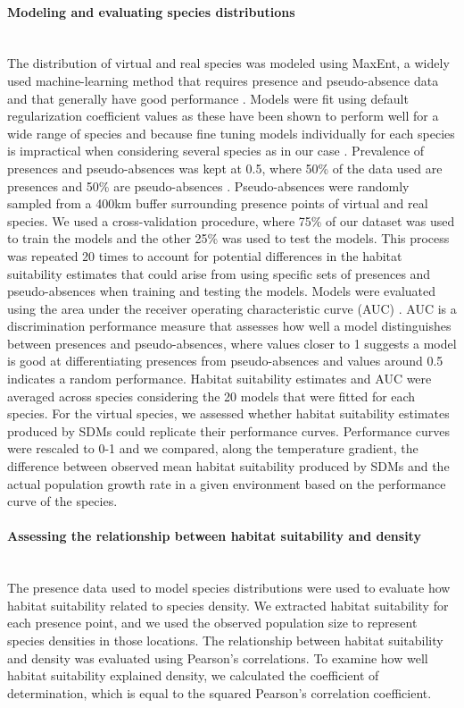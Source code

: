 \paragraph*{Modeling and evaluating species distributions}\mbox{}\\
The distribution of virtual and real species was modeled using MaxEnt, a widely used machine-learning method that requires presence and pseudo-absence data and that generally have good performance \parencite{elith2010, santini2021}. Models were fit using default regularization coefficient values as these have been shown to perform well for a wide range of species and because fine tuning models individually for each species is impractical when considering several species as in our case \parencite{phillips2008, merow2013}. Prevalence of presences and pseudo-absences was kept at 0.5, where 50\% of the data used are presences and 50\% are pseudo-absences \parencite{senay2013, iturbide2015}. Pseudo-absences were randomly sampled from a 400km buffer surrounding presence points of virtual and real species. We used a cross-validation procedure, where 75\% of our dataset was used to train the models and the other 25\% was used to test the models. This process was repeated 20 times to account for potential differences in the habitat suitability estimates that could arise from using specific sets of presences and pseudo-absences when training and testing the models. Models were evaluated using the area under the receiver operating characteristic curve (AUC) \parencite{fielding1997}. AUC is a discrimination performance measure that assesses how well a model distinguishes between presences and pseudo-absences, where values closer to 1 suggests a model is good at differentiating presences from pseudo-absences and values around 0.5 indicates a random performance. Habitat suitability estimates and AUC were averaged across species considering the 20 models that were fitted for each species. For the virtual species, we assessed whether habitat suitability estimates produced by SDMs could replicate their performance curves. Performance curves were rescaled to 0-1 and we compared, along the temperature gradient, the difference between observed mean habitat suitability produced by SDMs and the actual population growth rate in a given environment based on the performance curve of the species.




\paragraph*{Assessing the relationship between habitat suitability and density}\mbox{}\\
The presence data used to model species distributions were used to evaluate how habitat suitability related to species density.  We extracted habitat suitability for each presence point, and we used the observed population size to represent species densities in those locations. The relationship between habitat suitability and density was evaluated using Pearson's correlations. To examine how well habitat suitability explained density, we calculated the coefficient of determination, which is equal to the squared Pearson's correlation coefficient. 

